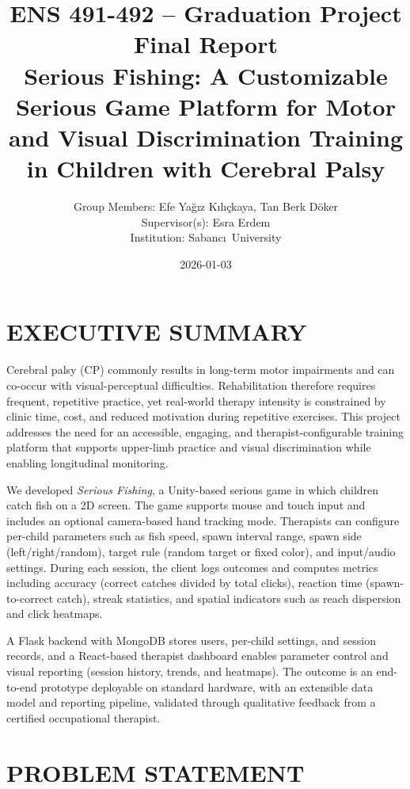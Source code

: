 \documentclass[12pt]{article}
\title{ENS 491-492 -- Graduation Project \\ Final Report \\
\vspace{0.5em}
Serious Fishing: A Customizable Serious Game Platform for Motor and Visual Discrimination Training in Children with Cerebral Palsy}
\author{Group Members: Efe Ya\u{g}\i z K\i l\i\c{c}kaya, Tan Berk D\"oker \\ Supervisor(s): Esra Erdem \\ Institution: Sabanc\i\ University}
\date{2026-01-03}
\begin{document}
\maketitle
\thispagestyle{empty}
\clearpage
\tableofcontents
\clearpage
\setcounter{page}{1}

\section{EXECUTIVE SUMMARY}
Cerebral palsy (CP) commonly results in long-term motor impairments and can co-occur with visual-perceptual difficulties. Rehabilitation therefore requires frequent, repetitive practice, yet real-world therapy intensity is constrained by clinic time, cost, and reduced motivation during repetitive exercises. This project addresses the need for an accessible, engaging, and therapist-configurable training platform that supports upper-limb practice and visual discrimination while enabling longitudinal monitoring.

We developed \textit{Serious Fishing}, a Unity-based serious game in which children catch fish on a 2D screen. The game supports mouse and touch input and includes an optional camera-based hand tracking mode. Therapists can configure per-child parameters such as fish speed, spawn interval range, spawn side (left/right/random), target rule (random target or fixed color), and input/audio settings. During each session, the client logs outcomes and computes metrics including accuracy (correct catches divided by total clicks), reaction time (spawn-to-correct catch), streak statistics, and spatial indicators such as reach dispersion and click heatmaps.

A Flask backend with MongoDB stores users, per-child settings, and session records, and a React-based therapist dashboard enables parameter control and visual reporting (session history, trends, and heatmaps). The outcome is an end-to-end prototype deployable on standard hardware, with an extensible data model and reporting pipeline, validated through qualitative feedback from a certified occupational therapist.

\clearpage
\section{PROBLEM STATEMENT}
\end{document}
